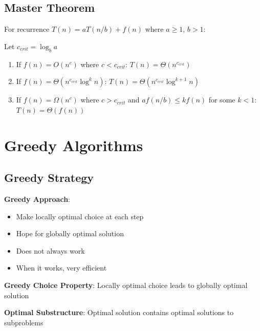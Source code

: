 \documentclass[12pt,a4paper]{report}
\begin{document}
\subsection{Master Theorem}
\begin{theorem}
For recurrence $T(n) = aT(n/b) + f(n)$ where $a \geq 1$, $b > 1$:

Let $c_{crit} = \log_b a$

\begin{enumerate}
    \item If $f(n) = O(n^c)$ where $c < c_{crit}$: $T(n) = \Theta(n^{c_{crit}})$
    \item If $f(n) = \Theta(n^{c_{crit}} \log^k n)$: $T(n) = \Theta(n^{c_{crit}} \log^{k+1} n)$
    \item If $f(n) = \Omega(n^c)$ where $c > c_{crit}$ and $af(n/b) \leq kf(n)$ for some $k < 1$: $T(n) = \Theta(f(n))$
\end{enumerate}
\end{theorem}

\section{Greedy Algorithms}

\subsection{Greedy Strategy}
\begin{concept}
\textbf{Greedy Approach}:
\begin{itemize}
    \item Make locally optimal choice at each step
    \item Hope for globally optimal solution
    \item Does not always work
    \item When it works, very efficient
\end{itemize}

\textbf{Greedy Choice Property}: Locally optimal choice leads to globally optimal solution

\textbf{Optimal Substructure}: Optimal solution contains optimal solutions to subproblems
\end{concept}
\end{document}
